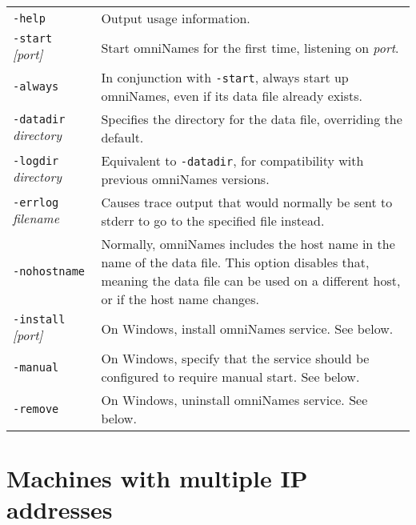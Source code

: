 \documentclass[draft,a4paper,11pt,twoside]{article}
\newcommand{\cmdline}[1]{\texttt{#1}}
\begin{document}
\noindent\begin{tabular}{lp{}}

\cmdline{-help} &
    Output usage information.\\[.5\baselineskip]

\cmdline{-start }\textit{[port]} &
    Start omniNames for the first time, listening on
    \textit{port}.\\[.5\baselineskip]

\cmdline{-always} &
    In conjunction with \cmdline{-start}, always start up
    omniNames, even if its data file already exists.\\[.5\baselineskip]

\cmdline{-datadir }\textit{directory} &
    Specifies the directory for the data file, overriding the
    default.\\[.5\baselineskip]

\cmdline{-logdir }\textit{directory} &
    Equivalent to \cmdline{-datadir}, for compatibility with previous
    omniNames versions.\\[.5\baselineskip]

\cmdline{-errlog }\textit{filename} &
    Causes trace output that would normally be sent to stderr to go to the
    specified file instead.\\[.5\baselineskip]

\cmdline{-nohostname} &
    Normally, omniNames includes the host name in the name of the data
    file. This option disables that, meaning the data file can be used
    on a different host, or if the host name changes.\\[.5\baselineskip]

\cmdline{-install }\textit{[port]} &
    On Windows, install omniNames service. See below.\\[.5\baselineskip]

\cmdline{-manual} &
    On Windows, specify that the service should be configured to
    require manual start. See below.\\[.5\baselineskip]

\cmdline{-remove} &
    On Windows, uninstall omniNames service. See below.\\[.5\baselineskip]

\end{tabular}


\section{Machines with multiple IP addresses}
\end{document}
